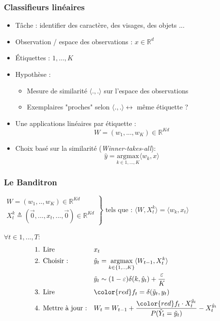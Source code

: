 \documentclass{beamer}
\begin{document}
\begin{frame}
	\frametitle{Classifieurs linéaires}
	\begin{itemize}
		\item Tâche : identifier des caractère, des visages, des objets ...
		\item Observation / espace des observations : $x \in \mathbb{R}^d $ 
		\item Étiquettes : $1,...,K$
		\item Hypothèse : 
		\begin{itemize}
			\item Mesure de similarité $\langle .,. \rangle$ sur l'espace des observations 
			\item Exemplaires "proches" selon $\langle .,. \rangle \leftrightarrow$ même étiquette ?
		\end{itemize}
		\item Une applications linéaires par étiquette :
		$$ W = (w_1, ..., w_K) \in \mathbb{R}^{Kd}$$
		\item Choix basé sur la similarité (\textit{Winner-takes-all}):
		$$ \hat{y} = \underset{k \in 1,...,K}{\text{argmax}}\langle w_k,x\rangle$$
	\end{itemize}
\end{frame}


\begin{frame}
	\frametitle{Le Banditron \cite{kakade2008efficient}}
			\begin{exampleblock}{}
				$
				\left.
				\begin{array}{l}
				W = (w_1,..,w_K) \in \mathbb{R}^{K d}\\
				X_t^k \triangleq (\vec{0}, ...,  x_t, ..., \vec{0}) \in \mathbb{R}^{K d}
				\end{array}
				\right\}
				\text{ tels que : }
				\langle W, X^k_t\rangle = \langle w_k, x_t\rangle
				$
				
			\end{exampleblock}
	\begin{block}{}
		$\forall t \in 1,...,T :$
		\begin{align*}
		&\text{1. Lire } 
		&& x_t 
		\\
		&\text{2. Choisir :} 
		&& \hat{y}_t = \underset{k \in\{1,..,K\}}{\text{argmax}}  \langle W_{t-1}, X_t^k \rangle 
		\\
		& %
		&& \tilde{y}_t \sim (1-\varepsilon) \delta(k,\hat{y}_t) + \frac{\varepsilon}{K} 
		\\	
		&\text{3. Lire } 
		&& {\color{red} f_t = \delta(\tilde{y}_t ,y_t)}  
		\\
		&\text{4. Mettre à jour :} 
		&& W_t = W_{t-1} + \frac{{\color{red}f_t}\cdot X_t^{\tilde{y}_t}}{P(\tilde{Y}_t=\tilde{y}_t)} - X_t^{\hat{y}_t} 
		\end{align*}
	\end{block}
	
\end{frame}
\end{document}
